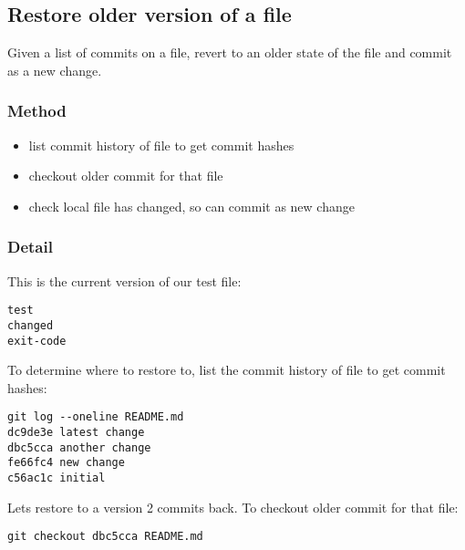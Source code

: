 
% 

\subsection*{Restore older version of a file}

\noindent Given a list of commits on a file, revert to an older state of the
file and commit as a new change.

\subsubsection*{Method}

\begin{itemize}
\item list commit history of file to get commit hashes
\item checkout older commit for that file
\item  check local file has changed, so can commit as new change
\end{itemize}

\subsubsection*{Detail}

\noindent This is the current version of our test file:

\begin{lstlisting}[language=ksh,caption={Test file: README.md}]
test
changed
exit-code
\end{lstlisting}

\noindent To determine where to restore to, list the commit history of file to get commit
hashes:

\begin{lstlisting}[language=ksh]
git log --oneline README.md
dc9de3e latest change
dbc5cca another change
fe66fc4 new change
c56ac1c initial
\end{lstlisting}

\noindent Lets restore to a version 2 commits back. To checkout older commit
for that file:

\begin{lstlisting}[language=ksh]
git checkout dbc5cca README.md
\end{lstlisting}


